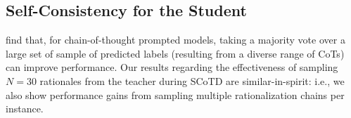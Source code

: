 \documentclass[11pt]{article}
\begin{document}
\subsection{Self-Consistency for the Student}
\label{sec:self_consistency}




\citet{wang2022self} find that, for chain-of-thought prompted models, taking a majority vote over a large set of sample of predicted labels (resulting from a diverse range of CoTs) can improve performance. Our results regarding the effectiveness of sampling $N=30$ rationales from the teacher during SCoTD are similar-in-spirit: i.e., we also show performance gains from sampling multiple rationalization chains per instance.
\end{document}
